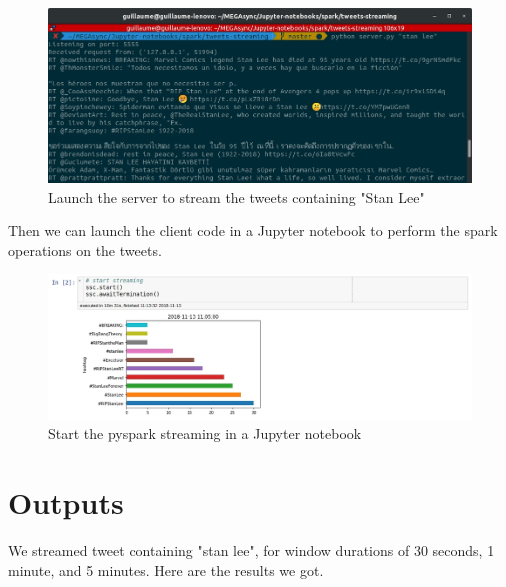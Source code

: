 \documentclass[12pt,a4paper]{article}
\begin{document}
\begin{figure}[h]
    \centering
    \includegraphics[width=1.0\textwidth]{usage-server.jpg}
    \caption{Launch the server to stream the tweets containing "Stan Lee"}
    \label{fig:my_label}
\end{figure}

Then we can launch the client code in a Jupyter notebook to perform the spark operations on the tweets. \\

\begin{figure}[H]
    \centering
    \includegraphics[width=1.0\textwidth]{usage-client.jpg}
    \caption{Start the pyspark streaming in a Jupyter notebook}
    \label{fig:my_label}
\end{figure}

\newpage
\section{Outputs}

We streamed tweet containing "stan lee", for window durations of 30 seconds, 1 minute, and 5 minutes. Here are the results we got.
\end{document}
